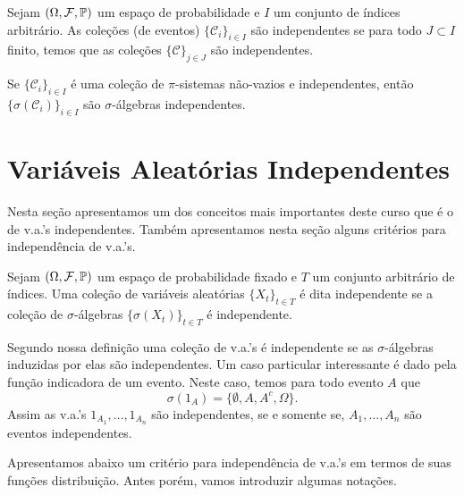 \begin{definicao}
Sejam $(\Omega,\mathcal{F},\mathbb{P})$ um espaço de probabilidade e 
$I$ um conjunto de índices arbitrário.  
As coleções (de eventos) $\{\mathcal{C}_i\}_{i\in I}$
são independentes se para todo $J\subset I$ finito,
temos que as coleções $\{\mathcal{C}\}_{j\in J}$
são independentes.
\end{definicao}




\begin{corolario}
	Se $\{\mathcal{C}_i\}_{i\in I}$ é uma coleção 
	de $\pi$-sistemas não-vazios e independentes, 
	então $\{\sigma(\mathcal{C}_i)\}_{i\in I}$ são
	$\sigma$-álgebras independentes.
\end{corolario}









\section{Variáveis Aleatórias Independentes}

Nesta seção apresentamos um dos conceitos mais 
importantes deste curso que é o de v.a.'s independentes.
Também apresentamos nesta seção alguns critérios para
independência de v.a.'s.


\begin{definicao}
\label{def-v.a.'s-independentes}
Sejam $(\Omega,\mathcal{F},\mathbb{P})$ um espaço de probabilidade fixado 
e $T$ um conjunto arbitrário de índices.
Uma coleção de variáveis aleatórias $\{X_t\}_{t\in T}$ 
é dita independente se a coleção de $\sigma$-álgebras 
$\{\sigma(X_t)\}_{t\in T}$ é independente.
\end{definicao}



Segundo nossa definição uma coleção de v.a.'s é 
independente se as $\sigma$-álgebras induzidas por
elas são independentes. Um caso particular interessante
é dado pela função indicadora de um evento. Neste 
caso, temos para todo evento $A$ que 
	\[
		\sigma(1_{A})=\{\emptyset, A,A^c,\Omega\}.
	\]
Assim as v.a.'s $1_{A_1},\ldots,1_{A_n}$ são 
independentes, se e somente se, $A_1,\ldots,A_n$ 
são eventos independentes. 

Apresentamos abaixo um critério para independência 
de v.a.'s em termos de suas funções distribuição.
Antes porém, vamos introduzir algumas notações.



